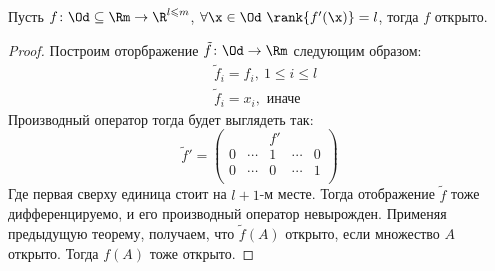 \begin{corollary}

    Пусть $f \colon \Od \subseteq \Rm \to \R^{l \leqslant m}$, $\forall \x \in
    \Od~ \rank{f'(\x)} = l$, тогда $f$ открыто.
\end{corollary}
\begin{proof}
    Построим оторбражение $\tilde{f} \colon \Od \to \Rm$ следующим образом:
\begin{align*}
    &\tilde{f}_i = f_i,~ 1 \leqslant i \leqslant l \\
    &\tilde{f}_i = x_i, \text{ иначе}
\end{align*}
    Производный оператор тогда будет выглядеть так: \\
\[
    \tilde{f}' = \begin{pmatrix}
                    & & f' \\
                    0 & \cdots & 1 & \cdots & 0 \\
                    0 & \cdots & 0 & \cdots & 1 \\
                \end{pmatrix}
\]
    Где первая сверху единица стоит на $l + 1$-м месте. Тогда отображение
    $\tilde{f}$ тоже дифференцируемо, и его производный оператор невырожден.
    Применяя предыдущую теорему, получаем, что $\tilde{f}(A)$ открыто, если
    множество $A$ открыто. Тогда $f(A)$ тоже открыто.
\end{proof}

